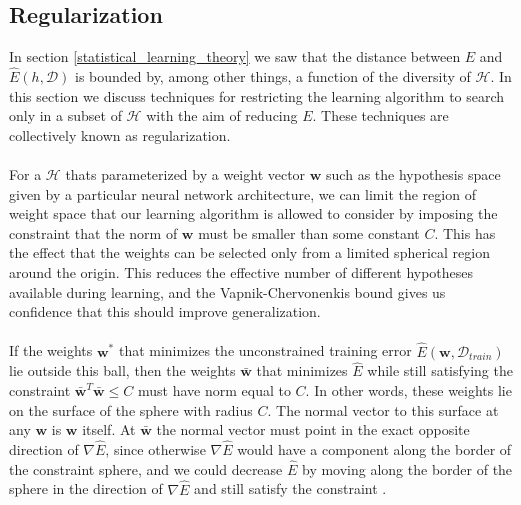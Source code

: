 \subsection{Regularization}
\label{regularisation}
In section \ref{statistical_learning_theory} we saw that the distance between $E$ and $\hat{E}(h, \mathcal{D})$ is bounded by, among other things, a function of the diversity of $\mathcal{H}$. In this section we discuss techniques for restricting the learning algorithm to search only in a subset of $\mathcal{H}$ with the aim of reducing $E$. These techniques are collectively known as regularization.
\\\\
For a $\mathcal{H}$ thats parameterized by a weight vector $\mathbf{w}$ such as the hypothesis space given by a particular neural network architecture, we can limit the region of weight space that our learning algorithm is allowed to consider by imposing the constraint that the norm of $\mathbf{w}$ must be smaller than some constant $C$. This has the effect that the weights can be selected only from a limited spherical region around the origin. This reduces the effective number of different hypotheses available during learning, and the Vapnik-Chervonenkis bound gives us confidence that this should improve generalization.
\\\\
If the weights $\mathbf{w}^*$ that minimizes the unconstrained training error $\hat{E}(\mathbf{w}, \mathcal{D}_{train})$ lie outside this ball, then the weights $\bar{\mathbf{w}}$ that minimizes $\hat{E}$ while still satisfying the constraint $\bar{\mathbf{w}}^T\bar{\mathbf{w}} \leq C$ must have norm equal to $C$. In other words, these weights lie on the surface of the sphere with radius $C$. The normal vector to this surface at any $\mathbf{w}$ is $\mathbf{w}$ itself. At $\bar{\mathbf{w}}$ the normal vector must point in the exact opposite direction of $\nabla \hat{E}$, since otherwise $\nabla \hat{E}$ would have a component along the border of the constraint sphere, and we could decrease $\hat{E}$ by moving along the border of the sphere in the direction of $\nabla \hat{E}$ and still satisfy the constraint \citep{yaser12}. 

